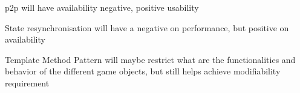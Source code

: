

\begin{description}[style=nextline]
  \item[T1\label{t1}] \gls{p2p} will have availability negative, positive usability
  \item[T2\label{t2}] State resynchronisation will have a negative on performance, but positive on availability
  \item[T3\label{t3}] Template Method Pattern will maybe restrict what are the functionalities and behavior of the different game objects, but still helps achieve modifiability requirement 
\end{description}
